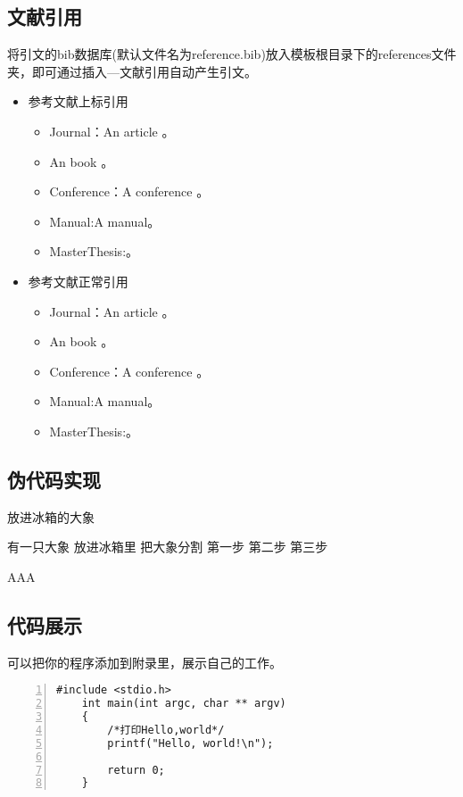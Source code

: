 \subsection{文献引用}
将引文的bib数据库(默认文件名为reference.bib)放入模板根目录下的references文件夹，即可通过插入---文献引用自动产生引文。
\begin{itemize}
	\item 参考文献上标引用
	\begin{itemize}
		\item Journal：An article 。%
		\item An book 。%
		\item Conference：A conference 。
		\item Manual:A manual。
		\item MasterThesis:。
	\end{itemize}
	\item 参考文献正常引用
	\begin{itemize}
	\item Journal：An article \cite{ELIDRISSI94,MELLINGER96}。%
	\item An book \cite{IEEE-1363,tex,companion}。%
	\item Conference：A conference \cite{kocher99,DPMG,cnproceed}。
	\item Manual:A manual\cite{NPB2}。
	\item MasterThesis:\cite{zhubajie,metamori2004,shaheshang,FistSystem01}。
\end{itemize}
\end{itemize}
\subsection{伪代码实现}
\begin{algorithm}
	\caption{放进冰箱的大象}\label{算法实例}
	\begin{algorithmic}
		\REQUIRE 有一只大象
		\ENSURE 放进冰箱里
		\STATE 把大象分割
		\ENDIF
		\ENDFOR
		\STATE 第一步
		\STATE 第二步
		\STATE 第三步
	\end{algorithmic}
	AAA\end{algorithm}
\subsection{代码展示}
可以把你的程序添加到附录里，展示自己的工作。
\begin{lstlisting}[language={[ANSI]C},
numbers=left,
numberstyle=\tiny,
basicstyle=\small\ttfamily,
stringstyle=\color{purple},
keywordstyle=\color{blue}\bfseries,
commentstyle=\color{olive},
directivestyle=\color{blue},
showstringspaces=false]
	#include <stdio.h>
	int main(int argc, char ** argv)
	{
		/*打印Hello,world*/
		printf("Hello, world!\n");
		
		return 0;
	}
\end{lstlisting}
